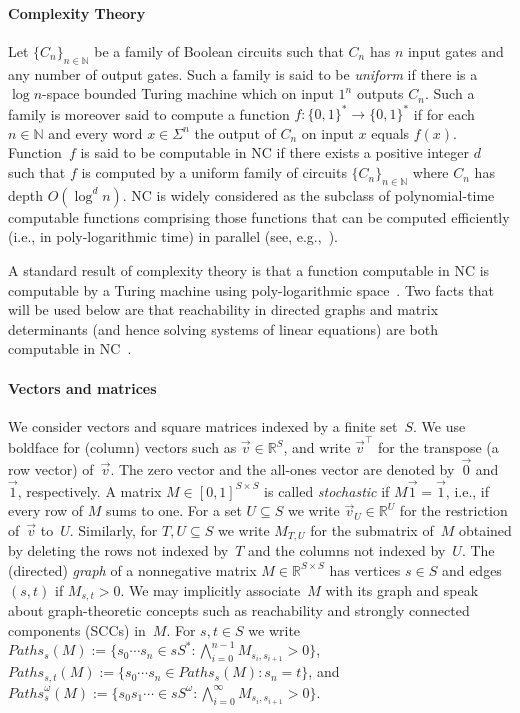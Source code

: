 \documentclass{elsarticle}
\def\Real{\mathbb{R}}
\def\Paths{\mathit{Paths}}
\begin{document}
\paragraph*{Complexity Theory}

Let $\{ C_n \}_{n\in\mathbb{N}}$ be a family of Boolean circuits such
that $C_n$ has $n$ input gates and any number of output gates.  Such a
family is said to be \emph{uniform} if there is a $\log n$-space
bounded Turing machine which on input $1^n$ outputs $C_n$.  Such a
family is moreover said to compute a function
$f:\{0,1\}^*\rightarrow\{0,1\}^*$ if for each $n\in \mathbb{N}$ and
every word $x \in \Sigma^n$ the output of $C_n$ on input $x$ equals
$f(x)$.
Function~$f$ is said to be computable in NC if there exists a
positive integer $d$ such that $f$ is computed by a uniform family
of circuits $\{ C_n \}_{n\in\mathbb{N}}$ where $C_n$ has depth
$O(\log^d n)$.  NC is widely considered as the subclass of
polynomial-time computable functions comprising those functions that
can be computed efficiently (i.e., in poly-logarithmic time) in
parallel (see, e.g.,~\cite[Chapter 15]{Pap94}).

A standard result of complexity theory is that a function computable
in NC is computable by a Turing machine using poly-logarithmic
space~\cite[Theorem 4]{Borodin77}.  Two facts that will be used below
are that reachability in directed graphs and matrix determinants (and
hence solving systems of linear equations) are both computable in
NC~\cite{Pap94}.

\paragraph*{Vectors and matrices}
We consider vectors and square matrices indexed by a finite set~$S$.
We use boldface for (column) vectors such as $\vec{v} \in \Real^S$,
and write $\vec{v}^\top$ for the transpose (a row vector)
of~$\vec{v}$.  The zero vector and the all-ones vector are denoted
by~$\vec{0}$ and $\vec{1}$, respectively.  A matrix
$M \in [0,1]^{S \times S}$ is called \emph{stochastic} if
$M \vec{1} = \vec{1}$, i.e., if every row of $M$ sums to one.  For a
set $U \subseteq S$ we write $\vec{v}_U \in \Real^U$ for the
restriction of~$\vec{v}$ to~$U$.  Similarly, for $T, U \subseteq S$ we
write $M_{T,U}$ for the submatrix of~$M$ obtained by deleting the rows
not indexed by~$T$ and the columns not indexed by~$U$.  The (directed)
\emph{graph} of a nonnegative matrix $M \in \Real^{S \times S}$ has
vertices $s \in S$ and edges $(s,t)$ if $M_{s,t} > 0$.  We may
implicitly associate~$M$ with its graph and speak about
graph-theoretic concepts such as reachability and strongly connected
components (SCCs) in~$M$.  For $s,t \in S$ we write
$\Paths_{s}(M) := \{s_0\cdots s_n \in sS^* : \bigwedge_{i=0}^{n-1}
M_{s_i,s_{i+1}}>0 \}$,
$\Paths_{s,t}(M) := \{s_0\cdots s_n \in \Paths_s(M) : s_n =t \}$, and
$\Paths^\omega_s(M) := \{s_0s_1 \cdots \in s S^\omega : \bigwedge_{i=0}^\infty M_{s_i,s_{i+1}}>0 \}$.
\end{document}
